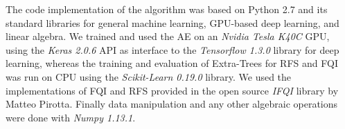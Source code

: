 The code implementation of the algorithm was based on Python 2.7 and its 
standard libraries for general machine learning, GPU-based deep learning, and
linear algebra. 
We trained and used the AE on an \textit{Nvidia Tesla K40C} GPU, using the 
\textit{Keras 2.0.6} API as interface to the \textit{Tensorflow 1.3.0} library 
for deep learning, whereas the training and evaluation of Extra-Trees 
for RFS and FQI was run on CPU using the \textit{Scikit-Learn 0.19.0} library.
We used the implementations of FQI and RFS provided in the open source 
\textit{IFQI} library by Matteo Pirotta.
Finally data manipulation and any other algebraic operations were done with 
\textit{Numpy 1.13.1}.




    




